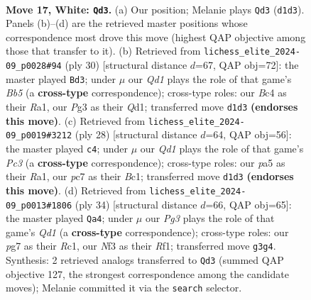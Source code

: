 \documentclass[11pt]{article}
\begin{document}
\clearpage

\begin{figure}[p]\centering
\begin{subfigure}{0.46\textwidth}\centering
\resizebox{\linewidth}{!}{%
\newchessgame
\chessboard[
  setfen={rr1q2k1/p1pb1ppp/4pn2/p7/2BPP2P/1P3NP1/P4P2/R2QR1K1 w - - 1 17},
  showmover=false,
  pgfstyle=straightmove, color=movearrow, markmove={d1-d3}
]}
\caption{}
\end{subfigure}\hfill
\begin{subfigure}{0.46\textwidth}\centering
\resizebox{\linewidth}{!}{%
\newchessgame
\chessboard[
  setfen={r4rk1/1pp1qppp/5nb1/pB6/P2pP1P1/1P5P/2PN1P2/R2Q1RK1 w - - 0 16},
  showmover=false,
  pgfstyle=straightmove, color=movearrow, markmove={b5-d3}
]}
\caption{}
\end{subfigure}
\\[4pt]
\begin{subfigure}{0.46\textwidth}\centering
\resizebox{\linewidth}{!}{%
\newchessgame
\chessboard[
  setfen={r1bqr1k1/5pp1/pp1p1n1p/4p3/P3P3/2PP1N1P/3Q1PP1/R1B1R1K1 w - - 0 15},
  showmover=false,
  pgfstyle=straightmove, color=movearrow, markmove={c3-c4}
]}
\caption{}
\end{subfigure}\hfill
\begin{subfigure}{0.46\textwidth}\centering
\resizebox{\linewidth}{!}{%
\newchessgame
\chessboard[
  setfen={r4rk1/1pp1b1p1/2n1q2p/p3pp2/8/P1BPN1P1/1P2PP1P/2RQ1RK1 w - - 0 18},
  showmover=false,
  pgfstyle=straightmove, color=movearrow, markmove={d1-a4}
]}
\caption{}
\end{subfigure}
\caption{\textbf{Move 17, White: \texttt{Qd3}.} (a) Our position; Melanie plays \texttt{Qd3} (\texttt{d1d3}). Panels (b)--(d) are the retrieved master positions whose correspondence most drove this move (highest QAP objective among those that transfer to it). (b) Retrieved from \texttt{lichess\_elite\_2024-09\_p0028\#94} (ply 30) [structural distance $d$=67, QAP obj=72]: the master played \texttt{Bd3}; under $\mu$ our \emph{Qd1} plays the role of that game's \emph{Bb5} (a \textbf{cross-type} correspondence); cross-type roles: our \emph{B}c4 as their \emph{R}a1, our \emph{P}g3 as their \emph{Q}d1; transferred move \texttt{d1d3} \textbf{(endorses this move)}. (c) Retrieved from \texttt{lichess\_elite\_2024-09\_p0019\#3212} (ply 28) [structural distance $d$=64, QAP obj=56]: the master played \texttt{c4}; under $\mu$ our \emph{Qd1} plays the role of that game's \emph{Pc3} (a \textbf{cross-type} correspondence); cross-type roles: our \emph{p}a5 as their \emph{R}a1, our \emph{p}c7 as their \emph{B}c1; transferred move \texttt{d1d3} \textbf{(endorses this move)}. (d) Retrieved from \texttt{lichess\_elite\_2024-09\_p0013\#1806} (ply 34) [structural distance $d$=66, QAP obj=65]: the master played \texttt{Qa4}; under $\mu$ our \emph{Pg3} plays the role of that game's \emph{Qd1} (a \textbf{cross-type} correspondence); cross-type roles: our \emph{p}g7 as their \emph{R}c1, our \emph{N}f3 as their \emph{R}f1; transferred move \texttt{g3g4}. Synthesis: 2 retrieved analogs transferred to \texttt{Qd3} (summed QAP objective 127, the strongest correspondence among the candidate moves); Melanie committed it via the \texttt{search} selector.}

\end{figure}
\end{document}
